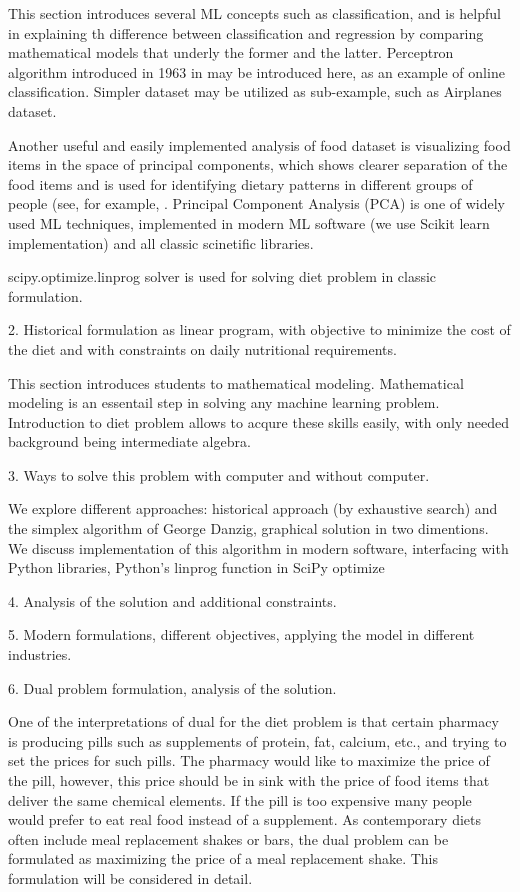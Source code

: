 \documentclass{article} %
\begin{document}
This section introduces several ML concepts such as classification, and is helpful in explaining th difference between classification and regression by comparing mathematical models that underly the former and the latter. Perceptron algorithm introduced in 1963 in \cite{ABR} may be introduced here, as an example of online classification. Simpler dataset may be utilized as sub-example, such as Airplanes dataset.

Another useful and easily implemented analysis  of food dataset is visualizing food items in the space of principal components,  which shows clearer separation of the food items and is used for identifying dietary patterns in different groups of people (see, for example, \cite{CS}. Principal Component Analysis (PCA) is one of widely used ML techniques, implemented in modern ML software (we use Scikit learn implementation) and all classic scinetific libraries. 

scipy.optimize.linprog solver is used for solving diet problem in classic formulation.


2. Historical formulation as linear program, with objective to minimize the cost of the diet and with constraints on daily nutritional requirements.

This section introduces students to mathematical modeling. Mathematical modeling is an essentail step in solving any machine learning problem. Introduction to diet problem allows to acqure these  skills easily, with only needed background being intermediate algebra.


3. Ways to solve this problem with computer and without computer.

We explore different approaches: historical approach (by exhaustive search) and the simplex algorithm of George Danzig, graphical solution in two dimentions. We discuss implementation of this algorithm in modern software, interfacing with Python libraries, Python's linprog function in SciPy optimize

4. Analysis of the solution and additional constraints.

5. Modern formulations, different objectives, applying the model in different industries.

6. Dual problem formulation, analysis of the solution.

One of the interpretations of dual for the diet problem is that certain pharmacy is producing pills such as supplements of protein, fat, calcium, etc., and trying to set the prices for such pills. The pharmacy would like to maximize the price of the pill, however, this price should be in sink with the price of food items that deliver the same chemical elements. If the pill is too expensive many people would prefer to eat real food instead of a supplement. As contemporary diets often include meal replacement shakes or bars, the dual problem can be formulated as maximizing the price of a meal replacement shake. This formulation will be considered in detail. 
\end{document}
